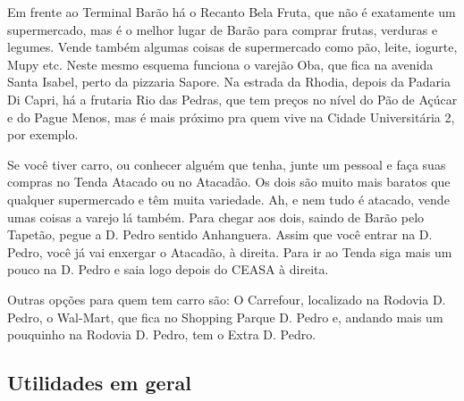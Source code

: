 Em frente ao Terminal Barão há o Recanto Bela Fruta, que não é exatamente um
supermercado, mas é o melhor lugar de Barão para comprar frutas, verduras e
legumes. Vende também algumas coisas de supermercado como pão, leite, iogurte,
Mupy etc. Neste mesmo esquema funciona o varejão Oba, que fica na avenida Santa
Isabel, perto da pizzaria Sapore. Na estrada da Rhodia, depois da Padaria Di
Capri, há a frutaria Rio das Pedras, que tem preços no nível do Pão de Açúcar e
do Pague Menos, mas é mais próximo pra quem vive na Cidade Universitária 2, por
exemplo.

Se você tiver carro, ou conhecer alguém que tenha, junte um pessoal e faça suas
compras no Tenda Atacado ou no Atacadão. Os dois são muito mais baratos que
qualquer supermercado e têm muita variedade. Ah, e nem tudo é atacado, vende
umas coisas a varejo lá também. Para chegar aos dois, saindo de Barão pelo
Tapetão, pegue a D. Pedro sentido Anhanguera. Assim que você entrar na D. Pedro,
você já vai enxergar o Atacadão, à direita. Para ir ao Tenda siga mais um pouco
na D.  Pedro e saia logo depois do CEASA à direita.

Outras opções para quem tem carro são: O Carrefour, localizado na Rodovia D.
Pedro, o Wal-Mart, que fica no Shopping Parque D. Pedro e, andando mais um 
pouquinho na Rodovia D. Pedro, tem o Extra D. Pedro.

\subsection{Utilidades em geral}

